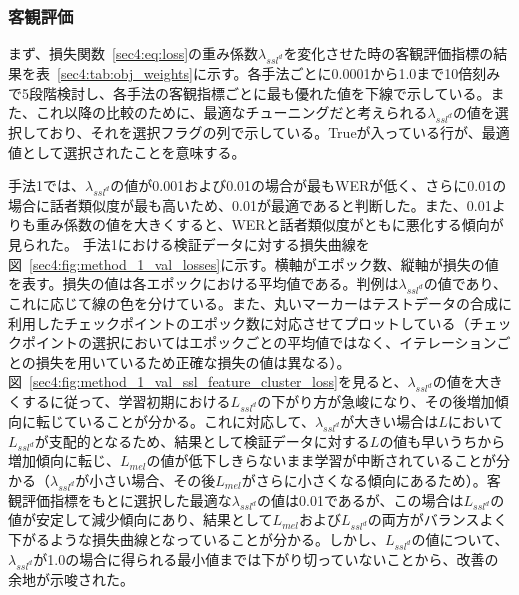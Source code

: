 \documentclass[12pt]{jarticle}
\numberwithin{equation}{section}    %
\numberwithin{figure}{section}      %
\numberwithin{table}{section}      %
\begin{document}
\subsubsection{客観評価}
まず、損失関数~\eqref{sec4:eq:loss}の重み係数$\lambda_{ssl^{d}}$を変化させた時の客観評価指標の結果を表~\ref{sec4:tab:obj_weights}に示す。各手法ごとに0.0001から1.0まで10倍刻みで5段階検討し、各手法の客観指標ごとに最も優れた値を下線で示している。また、これ以降の比較のために、最適なチューニングだと考えられる$\lambda_{ssl^{d}}$の値を選択しており、それを選択フラグの列で示している。Trueが入っている行が、最適値として選択されたことを意味する。

手法1では、$\lambda_{ssl^{d}}$の値が0.001および0.01の場合が最もWERが低く、さらに0.01の場合に話者類似度が最も高いため、0.01が最適であると判断した。また、0.01よりも重み係数の値を大きくすると、WERと話者類似度がともに悪化する傾向が見られた。
手法1における検証データに対する損失曲線を図~\ref{sec4:fig:method_1_val_losses}に示す。横軸がエポック数、縦軸が損失の値を表す。損失の値は各エポックにおける平均値である。判例は$\lambda_{ssl^{d}}$の値であり、これに応じて線の色を分けている。また、丸いマーカーはテストデータの合成に利用したチェックポイントのエポック数に対応させてプロットしている（チェックポイントの選択においてはエポックごとの平均値ではなく、イテレーションごとの損失を用いているため正確な損失の値は異なる）。図~\ref{sec4:fig:method_1_val_ssl_feature_cluster_loss}を見ると、$\lambda_{ssl^{d}}$の値を大きくするに従って、学習初期における$L_{ssl^{d}}$の下がり方が急峻になり、その後増加傾向に転じていることが分かる。これに対応して、$\lambda_{ssl^{d}}$が大きい場合は$L$において$L_{ssl^{d}}$が支配的となるため、結果として検証データに対する$L$の値も早いうちから増加傾向に転じ、$L_{mel}$の値が低下しきらないまま学習が中断されていることが分かる（$\lambda_{ssl^d}$が小さい場合、その後$L_{mel}$がさらに小さくなる傾向にあるため）。客観評価指標をもとに選択した最適な$\lambda_{ssl^{d}}$の値は0.01であるが、この場合は$L_{ssl^{d}}$の値が安定して減少傾向にあり、結果として$L_{mel}$および$L_{ssl^{d}}$の両方がバランスよく下がるような損失曲線となっていることが分かる。しかし、$L_{ssl^{d}}$の値について、$\lambda_{ssl^{d}}$が1.0の場合に得られる最小値までは下がり切っていないことから、改善の余地が示唆された。
\end{document}
